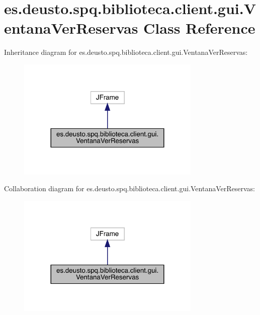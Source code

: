 \hypertarget{classes_1_1deusto_1_1spq_1_1biblioteca_1_1client_1_1gui_1_1_ventana_ver_reservas}{}\section{es.\+deusto.\+spq.\+biblioteca.\+client.\+gui.\+Ventana\+Ver\+Reservas Class Reference}
\label{classes_1_1deusto_1_1spq_1_1biblioteca_1_1client_1_1gui_1_1_ventana_ver_reservas}


Inheritance diagram for es.\+deusto.\+spq.\+biblioteca.\+client.\+gui.\+Ventana\+Ver\+Reservas\+:
\nopagebreak
\begin{figure}[H]
\begin{center}
\leavevmode
\includegraphics[width=248pt]{classes_1_1deusto_1_1spq_1_1biblioteca_1_1client_1_1gui_1_1_ventana_ver_reservas__inherit__graph}
\end{center}
\end{figure}


Collaboration diagram for es.\+deusto.\+spq.\+biblioteca.\+client.\+gui.\+Ventana\+Ver\+Reservas\+:
\nopagebreak
\begin{figure}[H]
\begin{center}
\leavevmode
\includegraphics[width=248pt]{classes_1_1deusto_1_1spq_1_1biblioteca_1_1client_1_1gui_1_1_ventana_ver_reservas__coll__graph}
\end{center}
\end{figure}
